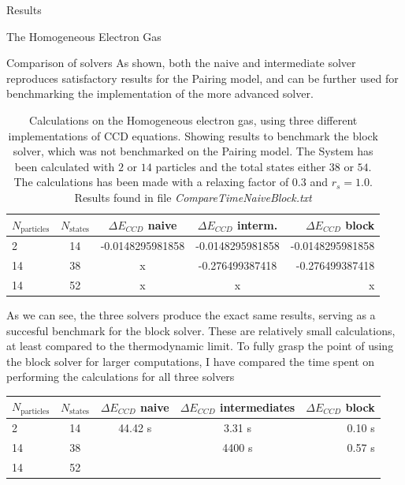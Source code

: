 \documentclass[twoside,english]{uiofysmaster}
\begin{document}
\begin{chapter}{Results}
\begin{section}{The Homogeneous Electron Gas}
		\begin{subsection}{Comparison of solvers}
			As shown, both the naive and intermediate solver reproduces satisfactory results for the Pairing model, and can be further used for benchmarking the implementation of the more advanced solver. 
			\begin{table}[H]
				\begin{center}
					\begin{tabular}[center]{l | c  c  c  r}
						$N_{\text{particles}}$ & $N_{\text{states}}$ & $ \Delta E_{CCD}$ naive  & $\Delta E_{CCD}$ interm. & $\Delta E_{CCD}$ block \\
						\hline
						2 & 14 & -0.0148295981858 & -0.0148295981858 & -0.0148295981858 \\
						14 & 38 & x & -0.276499387418 & -0.276499387418 \\
						14 & 52 & x & x & x 
					\end{tabular}
				\end{center}
				\caption{Calculations on the Homogeneous electron gas, using three different implementations of CCD equations. Showing results to benchmark the block solver, which was not benchmarked on the Pairing model. The System has been calculated with $2$ or $14$ particles and the total states either $38$ or $54$. The calculations has been made with a relaxing factor of $0.3$ and $r_s = 1.0$. Results found in file \textit{CompareTimeNaiveBlock.txt} \cite{WholmenGithub}}
				\label{table:CompareSolversHEG}
			\end{table}
			As we can see, the three solvers produce the exact same results, serving as a succesful benchmark for the block solver. These are relatively small calculations, at least compared to the thermodynamic limit. To fully grasp the point of using the block solver for larger computations, I have compared the time spent on performing the calculations for all three solvers
			\begin{table}[H]
				\begin{center}
					\begin{tabular}[center]{l | c  c  c  r}
						$N_{\text{particles}}$ & $N_{\text{states}}$ & $ \Delta E_{CCD}$ naive  & $\Delta E_{CCD}$ intermediates & $\Delta E_{CCD}$ block \\
						\hline
						2 & 14 & 44.42 s & 3.31 s & 0.10 s \\
						14 & 38 & & 4400 s & 0.57 s \\
						14 & 52 & & &  
					\end{tabular}
				\end{center}

\end{table}
\end{subsection}
\end{section}
\end{chapter}
\end{document}
